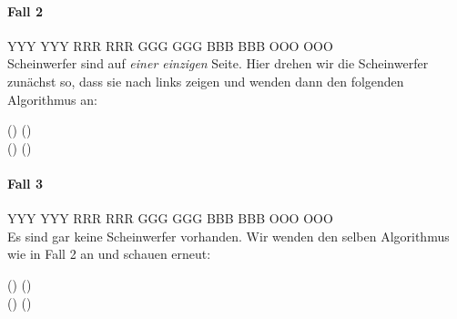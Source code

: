 \paragraph{Fall 2}
\RubikCubeGreyAll%
            {Y}{Y}{Y}
            {Y}{Y}{Y}%
               {R}{R}{R}
	       {R}{R}{R}%
	       {G}{G}{G}
	       {G}{G}{G}%
	      {B}{B}{B}
	      {B}{B}{B}%
	      {O}{O}{O}
	      {O}{O}{O}%
\\[1em]
Scheinwerfer sind auf \emph{einer einzigen} Seite. 
Hier drehen wir die Scheinwerfer zunächst so, dass sie nach links zeigen und wenden dann den folgenden Algorithmus an:
\begin{center}
	\sffamily\Large
	() () \\[1em]
	() ()
\end{center}

\pagebreak
\paragraph{Fall 3}
\RubikCubeGreyAll%
            {Y}{Y}{Y}
            {Y}{Y}{Y}%
               {R}{R}{R}
	       {R}{R}{R}%
	       {G}{G}{G}
	       {G}{G}{G}%
	      {B}{B}{B}
	      {B}{B}{B}%
	      {O}{O}{O}
	      {O}{O}{O}%
\\[1em]
Es sind gar keine Scheinwerfer vorhanden. Wir wenden den selben Algorithmus
wie in Fall 2 an und schauen erneut:
\begin{center}
	\sffamily\Large
	() () \\[1em]
	() ()
\end{center}
